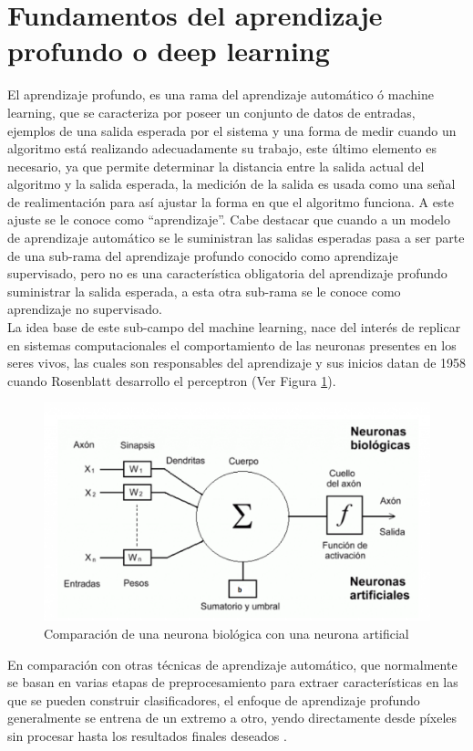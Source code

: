 \section{Fundamentos del aprendizaje profundo o deep learning}
El aprendizaje profundo, es una rama del aprendizaje automático ó machine learning, que se caracteriza por poseer un conjunto de datos de entradas, ejemplos de una salida esperada por el sistema y una forma de medir cuando un algoritmo está realizando adecuadamente su trabajo, este último elemento es necesario, ya que permite determinar la distancia entre la salida actual del algoritmo y la salida esperada, la medición de la salida es usada como una señal de realimentación para así ajustar la forma en que el algoritmo funciona. A este ajuste se le conoce como ``aprendizaje''. Cabe destacar que cuando a un modelo de aprendizaje automático se le suministran las salidas esperadas pasa a ser parte de una sub-rama del aprendizaje profundo conocido como aprendizaje supervisado, pero no es una característica obligatoria del aprendizaje profundo suministrar la salida esperada, a esta otra sub-rama se le conoce como aprendizaje no supervisado.
\\
La idea base de este sub-campo del machine learning, nace del interés de replicar en sistemas computacionales el comportamiento de las neuronas presentes en los seres vivos, las cuales son responsables del aprendizaje y sus inicios datan de 1958 cuando Rosenblatt desarrollo el perceptron (Ver Figura \ref{perceptron}).
\begin{figure}[H]
    \centering
    \includegraphics[scale=0.35]{Recursos/perceptron.png}
    \caption{Comparación de una neurona biológica con una neurona artificial}
    \label{perceptron}
\end{figure}
En comparación con otras técnicas de aprendizaje automático, que normalmente se basan en varias
etapas de preprocesamiento para extraer características en las que se pueden construir clasificadores, el enfoque de aprendizaje profundo
generalmente se entrena de un extremo a otro, yendo directamente desde píxeles sin procesar hasta los resultados finales deseados \cite{Szeliski2020}.
